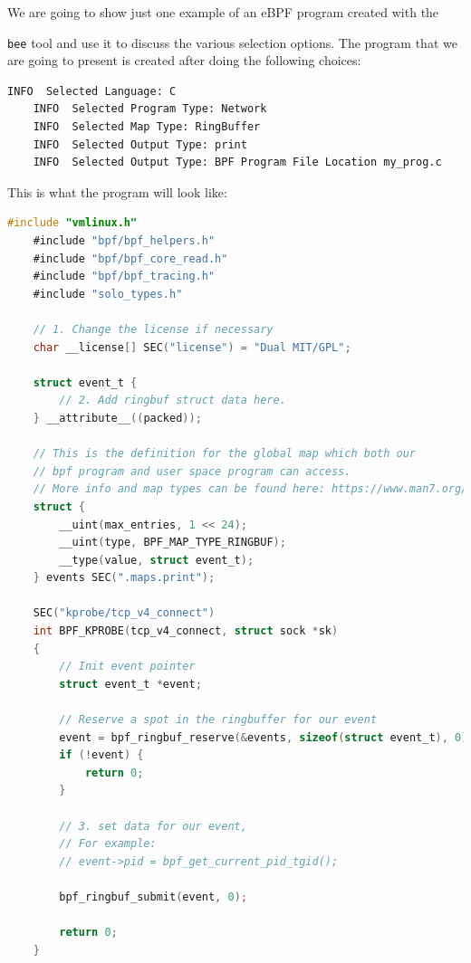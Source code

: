 We are going to show just one example of an eBPF program created with the \raggedright\colorbox{backcolour}{\lstinline[style=commandline, language=bash]|bee|} tool and use it to discuss the various selection options.
The program that we are going to present is created after doing the following choices:

\begin{lstlisting}[style=commandline, language=bash, caption={Choices to create our first program using \colorbox{backcolour}{\lstinline[style=commandline, language=bash]|bee|}.}]
	INFO  Selected Language: C
	INFO  Selected Program Type: Network
	INFO  Selected Map Type: RingBuffer
	INFO  Selected Output Type: print
	INFO  Selected Output Type: BPF Program File Location my_prog.c
\end{lstlisting}

This is what the program will look like:

\begin{lstlisting}[style=cstyle, language=C, caption={Code of the first program created using \colorbox{backcolour}{\lstinline[style=commandline, language=bash]|bee|}.}]
	#include "vmlinux.h"
	#include "bpf/bpf_helpers.h"
	#include "bpf/bpf_core_read.h"
	#include "bpf/bpf_tracing.h"
	#include "solo_types.h"
	
	// 1. Change the license if necessary 
	char __license[] SEC("license") = "Dual MIT/GPL";
	
	struct event_t {
		// 2. Add ringbuf struct data here.
	} __attribute__((packed));
	
	// This is the definition for the global map which both our
	// bpf program and user space program can access.
	// More info and map types can be found here: https://www.man7.org/linux/man-pages/man2/bpf.2.html
	struct {
		__uint(max_entries, 1 << 24);
		__uint(type, BPF_MAP_TYPE_RINGBUF);
		__type(value, struct event_t);
	} events SEC(".maps.print");
	
	SEC("kprobe/tcp_v4_connect")
	int BPF_KPROBE(tcp_v4_connect, struct sock *sk)
	{
		// Init event pointer
		struct event_t *event;
		
		// Reserve a spot in the ringbuffer for our event
		event = bpf_ringbuf_reserve(&events, sizeof(struct event_t), 0);
		if (!event) {
			return 0;
		}
		
		// 3. set data for our event,
		// For example:
		// event->pid = bpf_get_current_pid_tgid();
		
		bpf_ringbuf_submit(event, 0);
		
		return 0;
	}
\end{lstlisting}


